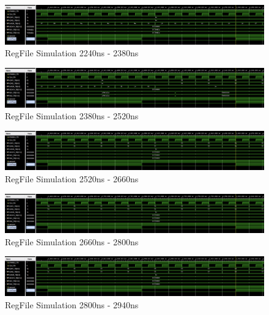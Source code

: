 \documentclass[
    a4paper, %
	12pt, %
    ]{CSSullivanBusinessReport}
\begin{document}
\begin{fullwidth}
\begin{figure}
    \centering
    \captionsetup{style=widetable}
    \includegraphics[width=.80\pdfpagewidth]{Figures/RegFile Simulation 16.png}
    \caption{RegFile Simulation 2240ns - 2380ns}
    \label{fig:regfilesim17}
\end{figure}

\begin{figure}
    \centering
    \captionsetup{style=widetable}
    \includegraphics[width=.80\pdfpagewidth]{Figures/RegFile Simulation 17.png}
    \caption{RegFile Simulation 2380ns - 2520ns}
    \label{fig:regfilesim18}
\end{figure}

\begin{figure}
    \centering
    \captionsetup{style=widetable}
    \includegraphics[width=.80\pdfpagewidth]{Figures/RegFile Simulation 18.png}
    \caption{RegFile Simulation 2520ns - 2660ns}
    \label{fig:regfilesim19}
\end{figure}

\begin{figure}
    \centering
    \captionsetup{style=widetable}
    \includegraphics[width=.80\pdfpagewidth]{Figures/RegFile Simulation 19.png}
    \caption{RegFile Simulation 2660ns - 2800ns}
    \label{fig:regfilesim20}
\end{figure}

\begin{figure}
    \centering
    \captionsetup{style=widetable}
    \includegraphics[width=.80\pdfpagewidth]{Figures/RegFile Simulation 20.png}
    \caption{RegFile Simulation 2800ns - 2940ns}
    \label{fig:regfilesim21}
\end{figure}


\end{fullwidth}
\end{document}
